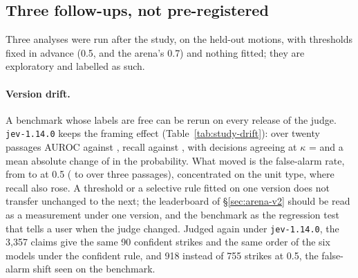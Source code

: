 \FloatBarrier
\subsection{Three follow-ups, not pre-registered}
\label{sec:followups}

Three analyses were run after the study, on the held-out motions, with thresholds fixed in advance (0.5, and the arena's 0.7) and nothing fitted; they are exploratory and labelled as such.

\begin{table}[htbp]
\centering\small
{}
\caption{Version drift: the framed criterion under \texttt{jev-1.13.0} and \texttt{jev-1.14.0} (released 14 October 2026) on the same held-out items.}
\label{tab:study-drift}
\end{table}

\paragraph{Version drift.} A benchmark whose labels are free can be rerun on every release of the judge. \texttt{jev-1.14.0} keeps the framing effect (Table~\ref{tab:study-drift}): over twenty passages AUROC \studyDriftAurocNewTwoZero{} against \studyDriftAurocOldTwoZero{}, recall \studyDriftRecallNewTwoZero{} against \studyDriftRecallOldTwoZero{}, with decisions agreeing at $\kappa$ = \studyDriftKappaTwoZero{} and a mean absolute change of \studyDriftDeltaTwoZero{} in the probability. What moved is the false-alarm rate, from \studyDriftFaOldTwoZero{} to \studyDriftFaNewTwoZero{} at 0.5 (\studyDriftFaOldThree{} to \studyDriftFaNewThree{} over three passages), concentrated on the unit type, where recall also rose. A threshold or a selective rule fitted on one version does not transfer unchanged to the next; the leaderboard of \S\ref{sec:arena-v2} should be read as a measurement under one version, and the benchmark as the regression test that tells a user when the judge changed. Judged again under \texttt{jev-1.14.0}, the 3,357 claims give the same 90 confident strikes and the same order of the six models under the confident rule, and 918 instead of 755 strikes at 0.5, the false-alarm shift seen on the benchmark.

\begin{table}[htbp]
\centering\small
{}
\caption{The evidence gate: \jev{}'s first two-step question (does a passage describe the same fact?) over the three passages, at 0.5, splits the held-out items; each judge's accuracy, recall and false alarms on the items the gate passes and rejects.}
\label{tab:study-gate}
\end{table}

